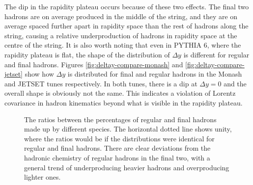 \documentclass[12pt,a4paper]{report}
\begin{document}
The dip in the rapidity plateau occurs because of these two effects. The final two hadrons are on average produced in the middle of the string, and they are on average spaced further apart in rapidity space than the rest of hadrons along the string, causing a relative underproduction of hadrons in rapidity space at the centre of the string. It is also worth noting that even in PYTHIA 6, where the rapidity plateau is flat, the shape of the distribution of $\Delta y$ is different for regular and final hadrons. Figures \ref{fig:deltay-compare-monash} and \ref{fig:deltay-compare-jetset} show how $\Delta y$ is distributed for final and regular hadrons in the Monash and JETSET tunes respectively. In both tunes, there is a dip at $\Delta y = 0$ and the overall shape is obviously not the same. This indicates a violation of Lorentz covariance in hadron kinematics beyond what is visible in the rapidity plateau.

\begin{figure}
  \centering
  
  \caption{The ratios between the percentages of regular and final hadrons made up by different species. The horizontal dotted line shows unity, where the ratios would be if the distributions were identical for regular and final hadrons. There are clear deviations from the hadronic chemistry of regular hadrons in the final two, with a general trend of underproducing heavier hadrons and overproducing lighter ones.}
  \label{fig:hadrochemistry-monash}
\end{figure}
  
\end{document}

